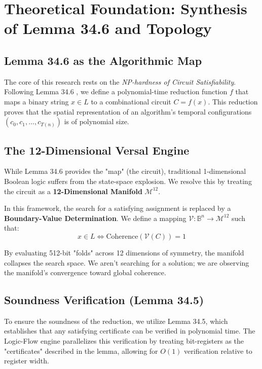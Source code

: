 \documentclass[11pt,a4paper]{article}
\begin{document}
\newpage

\section{Theoretical Foundation: Synthesis of Lemma 34.6 and Topology}

\subsection{Lemma 34.6 as the Algorithmic Map}
The core of this research rests on the \textit{NP-hardness of Circuit Satisfiability}. Following Lemma 34.6 \cite{CLRS}, we define a polynomial-time reduction function $f$ that maps a binary string $x \in L$ to a combinational circuit $C = f(x)$. This reduction proves that the spatial representation of an algorithm's temporal configurations $(c_0, c_1, \dots, c_{T(n)})$ is of polynomial size.

\subsection{The 12-Dimensional Versal Engine}
While Lemma 34.6 provides the "map" (the circuit), traditional 1-dimensional Boolean logic suffers from the state-space explosion. We resolve this by treating the circuit as a \textbf{12-Dimensional Manifold} $\mathcal{M}^{12}$.

In this framework, the search for a satisfying assignment is replaced by a \textbf{Boundary-Value Determination}. We define a mapping $\mathcal{V}: \mathbb{B}^n \to \mathcal{M}^{12}$ such that:
\begin{equation} \label{eq:reduction}
x \in L \iff \text{Coherence}(\mathcal{V}(C)) = 1
\end{equation}

By evaluating 512-bit "folds" across 12 dimensions of symmetry, the manifold collapses the search space. We aren't searching for a solution; we are observing the manifold's convergence toward global coherence.

\subsection{Soundness Verification (Lemma 34.5)}
To ensure the soundness of the reduction, we utilize Lemma 34.5, which establishes that any satisfying certificate can be verified in polynomial time. The Logic-Flow engine parallelizes this verification by treating bit-registers as the "certificates" described in the lemma, allowing for $O(1)$ verification relative to register width.
\end{document}

